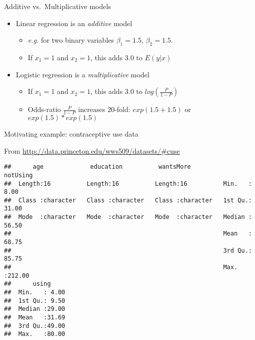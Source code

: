 \documentclass[
  ignorenonframetext,
]{beamer}
\providecommand{\tightlist}{%
  \setlength{\itemsep}{0pt}\setlength{\parskip}{0pt}}
\begin{document}
\begin{frame}{Additive vs.~Multiplicative models}
\protect\hypertarget{additive-vs.-multiplicative-models}{}

\begin{itemize}
\tightlist
\item
  Linear regression is an \emph{additive} model

  \begin{itemize}
  \tightlist
  \item
    \emph{e.g.} for two binary variables \(\beta_1 = 1.5\),
    \(\beta_2 = 1.5\).
  \item
    If \(x_1=1\) and \(x_2=1\), this adds 3.0 to \(E(y|x)\)
  \end{itemize}
\item
  Logistic regression is a \emph{multiplicative} model

  \begin{itemize}
  \tightlist
  \item
    If \(x_1=1\) and \(x_2=1\), this adds 3.0 to \(log(\frac{P}{1-P})\)
  \item
    Odds-ratio \(\frac{P}{1-P}\) increases 20-fold: \(exp(1.5+1.5)\) or
    \(exp(1.5) * exp(1.5)\)
  \end{itemize}
\end{itemize}

\end{frame}

\begin{frame}[fragile]{Motivating example: contraceptive use data}
\protect\hypertarget{motivating-example-contraceptive-use-data}{}

From \url{http://data.princeton.edu/wws509/datasets/\#cuse}

\begin{verbatim}
##      age             education          wantsMore            notUsing     
##  Length:16          Length:16          Length:16          Min.   :  8.00  
##  Class :character   Class :character   Class :character   1st Qu.: 31.00  
##  Mode  :character   Mode  :character   Mode  :character   Median : 56.50  
##                                                           Mean   : 68.75  
##                                                           3rd Qu.: 85.75  
##                                                           Max.   :212.00  
##      using      
##  Min.   : 4.00  
##  1st Qu.: 9.50  
##  Median :29.00  
##  Mean   :31.69  
##  3rd Qu.:49.00  
##  Max.   :80.00
\end{verbatim}

\end{frame}
\end{document}
